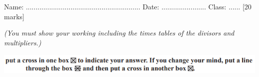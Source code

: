\documentclass{article}
\date{}
\begin{document}
\fontsize{13}{15} \selectfont %

\begin{center}
  \qquad \\ 
\end{center} \\ 

Name: ...........................................................  \hspace{0.5cm}  Date: ....................... \hspace{0.5cm}  Class: ......\hspace{0.5cm} [20 marks]

\par
\vspace*{5pt} 
\textit{(You must show your working including the times tables of the divisors and multipliers.)  }

\begin{center}
    \includegraphics[width=15cm]{Year_6_Mixed_Tests/Xx.png}
\end{center}
 \\
\end{document}
